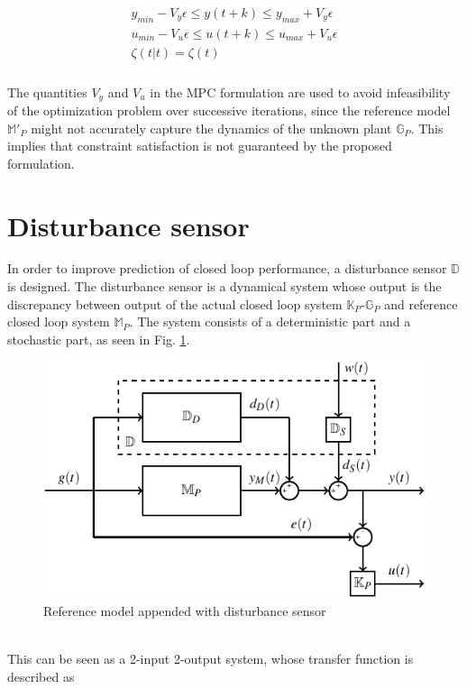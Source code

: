 \documentclass[letterpaper, 10 pt, conference]{ieeeconf}  %
\begin{document}
\begin{enumerate}
\begin{equation}
\begin{aligned}
\begin{matrix}
	y_{min}-V_y\epsilon \leq y(t+k) \leq y_{max}+V_y\epsilon \\
	u_{min}-V_u\epsilon \leq u(t+k) \leq u_{max}+V_u\epsilon \\
	\zeta(t|t) = \zeta(t)
	\end{matrix}
	\end{aligned}
	\label{MPC}
	\end{equation}
	\\
	The quantities $V_y$ and $V_u$ in the MPC formulation are used to avoid infeasibility of the optimization problem over successive iterations, since the reference model $\mathbb{M}'_P$ might not accurately capture the dynamics of the unknown plant $\mathbb{G}_P$. This implies that constraint satisfaction is not guaranteed by the proposed formulation. 
	
	\section{Disturbance sensor}
	In order to improve prediction of closed loop performance, a disturbance sensor $\mathbb{D}$ is designed. The disturbance sensor is a dynamical system whose output is the discrepancy between output of the actual closed loop system  $\mathbb{K}_P$-$\mathbb{G}_P$ and reference closed loop system $\mathbb{M}_P$. The system consists of a deterministic part and a stochastic part, as seen in Fig. \ref{Appended}.
	\begin{figure}[h]
		\includegraphics{Mp-D-E.pdf}
		\caption{Reference model appended with disturbance sensor}
		\label{Appended}
	\end{figure}
	\\
	This can be seen as a 2-input 2-output system, whose transfer function is described as
	\begin{equation}

\end{equation}
\end{enumerate}
\end{document}
